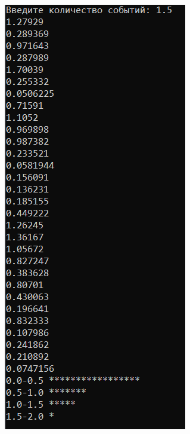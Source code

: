 \documentclass{beamer}
\begin{document}
\begin{frame}
\begin{columns}[t]
\begin{column}{0.25\textwidth}
\end{column}
\begin{column}{0.25\textwidth}
\includegraphics[width=\textwidth]{exp_dist2.png}

\end{column}
\end{columns}
\end{frame}
\end{document}
